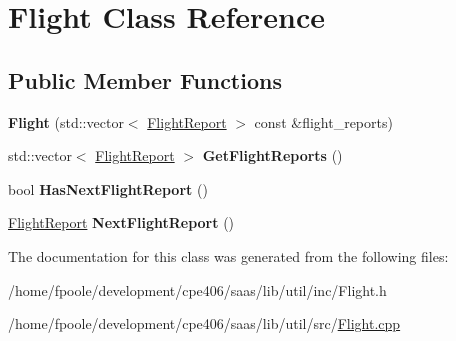 \hypertarget{class_flight}{}\section{Flight Class Reference}
\label{class_flight}
\subsection*{Public Member Functions}
\begin{DoxyCompactItemize}
\item 
\hypertarget{class_flight_a2501b1f6e7764a4d2e97f289ea2fdce9}{}{\bfseries Flight} (std\+::vector$<$ \hyperlink{class_flight_report}{Flight\+Report} $>$ const \&flight\+\_\+reports)\label{class_flight_a2501b1f6e7764a4d2e97f289ea2fdce9}

\item 
\hypertarget{class_flight_a9d9da1da128155713f839b30ea7188f4}{}std\+::vector$<$ \hyperlink{class_flight_report}{Flight\+Report} $>$ {\bfseries Get\+Flight\+Reports} ()\label{class_flight_a9d9da1da128155713f839b30ea7188f4}

\item 
\hypertarget{class_flight_a911af19fc252a1e9f44ede051f5c86c7}{}bool {\bfseries Has\+Next\+Flight\+Report} ()\label{class_flight_a911af19fc252a1e9f44ede051f5c86c7}

\item 
\hypertarget{class_flight_ac32cc38e0d61fdfc8818747889034a37}{}\hyperlink{class_flight_report}{Flight\+Report} {\bfseries Next\+Flight\+Report} ()\label{class_flight_ac32cc38e0d61fdfc8818747889034a37}

\end{DoxyCompactItemize}


The documentation for this class was generated from the following files\+:\begin{DoxyCompactItemize}
\item 
/home/fpoole/development/cpe406/saas/lib/util/inc/Flight.\+h\item 
/home/fpoole/development/cpe406/saas/lib/util/src/\hyperlink{_flight_8cpp}{Flight.\+cpp}\end{DoxyCompactItemize}
